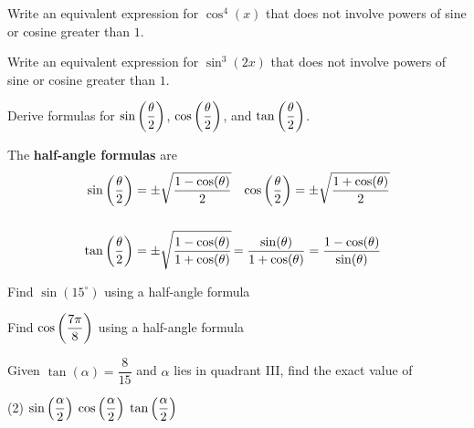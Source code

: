 \documentclass[../mathNotesPreamble]{subfiles}
\begin{document}
  \begin{ex*}
    Write an equivalent expression for $\cos^4(x)$ that does not involve powers of sine or cosine greater than $1$.
  \end{ex*}

  \begin{ex*}
    Write an equivalent expression for $\sin^3(2x)$ that does not involve powers of sine or cosine greater than $1$.
  \end{ex*}
  \pagebreak

  \begin{ex*}
    Derive formulas for $\sin{\left(\dfrac{\theta}{2}\right)}$, $\cos{\left(\dfrac{\theta}{2}\right)}$, and $\tan{\left(\dfrac{\theta}{2}\right)}$.
  \end{ex*}
  \begin{defn*}
    The \textbf{half-angle formulas} are
    \begin{align*}
      \sin\parens{\dfrac{\theta}{2}}&=\pm\sqrt{\dfrac{1-\cos(\theta)}{2}}&
      \cos\parens{\dfrac{\theta}{2}}&=\pm\sqrt{\dfrac{1+\cos(\theta)}{2}}\\[\baselineskip]
      \tan\parens{\dfrac{\theta}{2}}&=\pm\sqrt{\dfrac{1-\cos(\theta)}{1+\cos(\theta)}}
        \mathrlap{\,=\dfrac{\sin(\theta)}{1+\cos(\theta)}=\dfrac{1-\cos(\theta)}{\sin(\theta)}}
    \end{align*}
  \end{defn*}
  \pagebreak

  \begin{ex*}
    Find $\sin(15^\circ)$ using a half-angle formula
  \end{ex*}

  \begin{ex*}
    Find $\cos{\left(\dfrac{7\pi}{8}\right)}$ using a half-angle formula
  \end{ex*}

  \begin{ex*}
    Given $\tan(\alpha)=\dfrac{8}{15}$ and $\alpha$ lies in quadrant III, find the exact value of
    \begin{extasks}[after-item-skip=\stretch{1}](2)
      \task* $\sin{\left(\dfrac{\alpha}{2}\right)}$
      \task $\cos{\left(\dfrac{\alpha}{2}\right)}$
      \task $\tan{\left(\dfrac{\alpha}{2}\right)}$
    \end{extasks}
  \end{ex*}
  \pagebreak
\end{document}
